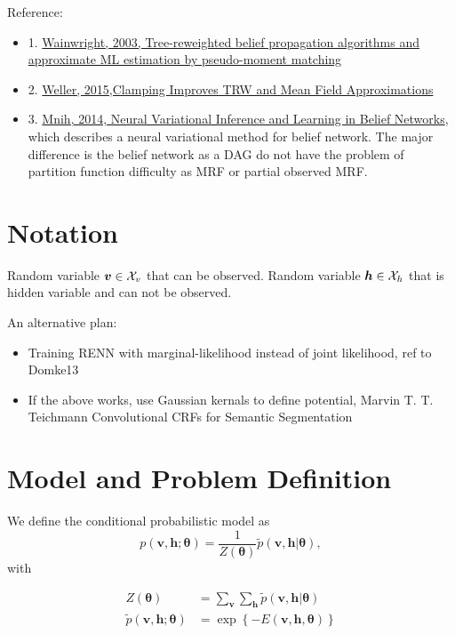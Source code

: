 Reference:
\begin{itemize}
\item 1. \href{http://ssg.mit.edu/group/willsky/publ_pdfs/166_pub_AISTATS.pdf}{Wainwright, 2003, Tree-reweighted belief propagation algorithms and approximate ML estimation by pseudo-moment matching}
\item 2. \href{https://arxiv.org/abs/1510.00087}{Weller, 2015,Clamping Improves TRW and Mean Field Approximations}
\item 3. \href{https://arxiv.org/pdf/1402.0030.pdf}{Mnih, 2014, Neural Variational Inference and Learning in Belief Networks}, which describes a neural variational method for belief network. The major difference is the belief network as a DAG do not have the problem of partition function difficulty as MRF or partial observed MRF.
  
\end{itemize}

\section{Notation}
Random variable $\bm{v} \in \mathcal{X}_v$ that can be observed.
Random variable $\bm{h} \in \mathcal{X}_h$ that is hidden variable and can not be observed.

An alternative plan:
\begin{itemize}
\item Training RENN with marginal-likelihood instead of joint likelihood, ref to Domke13
\item If the above works, use Gaussian kernals to define potential, Marvin T. T. Teichmann Convolutional CRFs for Semantic Segmentation
\end{itemize}

\section{Model and Problem Definition}

We define the conditional probabilistic model as
\begin{equation}\label{eq:model}
  p(\bm{v}, \bm{h} ; \bm{\theta}) = \frac{1}{Z(\bm{\theta})} \tilde{p}(\bm{v}, \bm{h} |\bm{\theta}),
\end{equation}
with

\begin{align}
  Z(\bm{\theta}) & = \sum_{\bm{v}}\sum_{\bm{h}} \tilde{p}(\bm{v}, \bm{h} |\bm{\theta})\\
  \tilde{p}(\bm{v}, \bm{h} ; \bm{\theta}) & = \exp\left\{-E(\bm{v}, \bm{h}, \bm{\theta})\right\}
\end{align}

